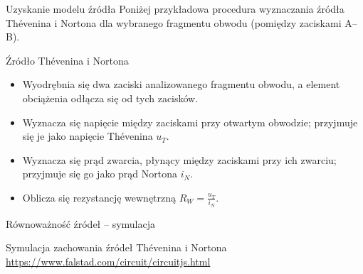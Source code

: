 \begin{frame}{Uzyskanie modelu źródła}
	Poniżej przykładowa procedura wyznaczania źródła Thévenina i Nortona
	dla wybranego fragmentu obwodu (pomiędzy zaciskami A–B).
	\begin{block}{Źródło Thévenina i Nortona}
		\begin{itemize}
			\item[\bt] Wyodrębnia się dwa zaciski analizowanego fragmentu obwodu,
			      a element obciążenia odłącza się od tych zacisków.
			\item[\bt] Wyznacza się napięcie między zaciskami przy otwartym obwodzie;
			      przyjmuje się je jako napięcie Thévenina $u_T$.
			\item[\bt] Wyznacza się prąd zwarcia, płynący między zaciskami przy ich zwarciu;
			      przyjmuje się go jako prąd Nortona $i_N$.
			\item[\bt] Oblicza się rezystancję wewnętrzną $R_W = \tfrac{u_T}{i_N}$.
		\end{itemize}
	\end{block}
\end{frame}

\begin{frame}{Równoważność źródeł – symulacja}
	\begin{block}{Symulacja zachowania źródeł Thévenina i Nortona}
		\url{https://www.falstad.com/circuit/circuitjs.html}
	\end{block}
\end{frame}